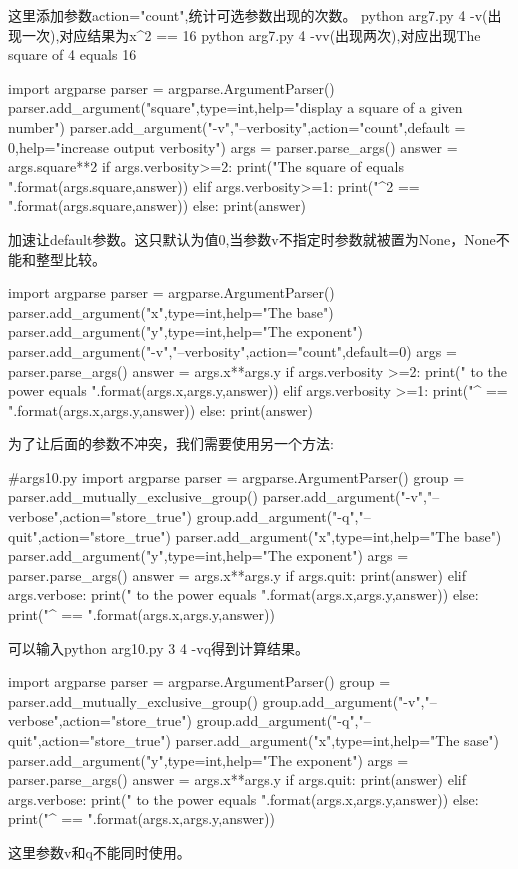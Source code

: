 这里添加参数action="count",统计可选参数出现的次数。
python arg7.py 4 -v(出现一次),对应结果为x\^{}2 == 16\newline
python arg7.py 4 -vv(出现两次),对应出现The square of 4 equals 16\newline
\begin{python}
import argparse
parser = argparse.ArgumentParser()
parser.add_argument("square",type=int,help="display a square of a given number")
parser.add_argument("-v","--verbosity",action="count",default = 0,help="increase output verbosity")
args = parser.parse_args()
answer = args.square**2
if args.verbosity>=2:
    print("The square of {} equals {}".format(args.square,answer))
elif args.verbosity>=1:
    print("{}^2 == {}".format(args.square,answer))
else:
    print(answer)
\end{python}
加速让default参数。这只默认为值0,当参数v不指定时参数就被置为None，None不能和整型比较。
\begin{python}
import argparse
parser = argparse.ArgumentParser()
parser.add_argument("x",type=int,help="The base")
parser.add_argument("y",type=int,help="The exponent")
parser.add_argument("-v","--verbosity",action="count",default=0)
args = parser.parse_args()
answer = args.x**args.y
if args.verbosity >=2:
    print("{} to the power {} equals {}".format(args.x,args.y,answer))
elif args.verbosity >=1:
    print("{}^{} == {}".format(args.x,args.y,answer))
else:
    print(answer)
\end{python}
为了让后面的参数不冲突，我们需要使用另一个方法:
\begin{python}
#args10.py
import argparse
parser = argparse.ArgumentParser()
group = parser.add_mutually_exclusive_group()
parser.add_argument("-v","--verbose",action="store_true")
group.add_argument("-q","--quit",action="store_true")
parser.add_argument("x",type=int,help="The base")
parser.add_argument("y",type=int,help="The exponent")
args = parser.parse_args()
answer = args.x**args.y
if args.quit:
    print(answer)
elif args.verbose:
    print("{} to the power {} equals {}".format(args.x,args.y,answer))
else:
    print("{}^{} == {}".format(args.x,args.y,answer))
\end{python}
可以输入python arg10.py 3 4 -vq得到计算结果。
\begin{python}
import argparse
parser = argparse.ArgumentParser()
group = parser.add_mutually_exclusive_group()
group.add_argument("-v","--verbose",action="store_true")
group.add_argument("-q","--quit",action="store_true")
parser.add_argument("x",type=int,help="The sase")
parser.add_argument("y",type=int,help="The exponent")
args = parser.parse_args()
answer = args.x**args.y
if args.quit:
    print(answer)
elif args.verbose:
    print("{} to the power {} equals {}".format(args.x,args.y,answer))
else:
    print("{}^{} == {}".format(args.x,args.y,answer))
\end{python}
这里参数v和q不能同时使用。

